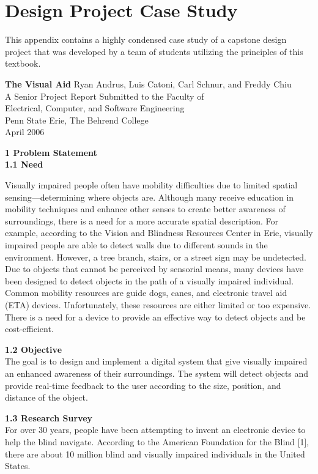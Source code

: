 \chapter{Design Project Case Study}
\label{chapter:appendixE}
\graphicspath{ {./appendixE/Fig} }

This appendix contains a highly condensed case study of a capstone
design project that was developed by a team of students utilizing the
principles of this textbook. 

\textbf{The Visual Aid}
Ryan Andrus, Luis Catoni, Carl Schnur, and Freddy Chiu \\
A Senior Project Report Submitted to the Faculty of \\
Electrical, Computer, and Software Engineering \\
Penn State Erie, The Behrend College \\
April 2006

\textbf{1 Problem Statement}\\
\textbf{1.1 Need}


Visually impaired people often have mobility difficulties due to limited
spatial sensing---determining where objects are. Although many receive
education in mobility techniques and enhance other senses to create
better awareness of surroundings, there is a need for a more accurate
spatial description. For example, according to the Vision and Blindness
Resources Center in Erie, visually impaired people are able to detect
walls due to different sounds in the environment. However, a tree
branch, stairs, or a street sign may be undetected. Due to objects that
cannot be perceived by sensorial means, many devices have been designed
to detect objects in the path of a visually impaired individual. Common
mobility resources are guide dogs, canes, and electronic travel aid
(ETA) devices. Unfortunately, these resources are either limited or too
expensive. There is a need for a device to provide an effective way to
detect objects and be cost-efficient.


\textbf{1.2 Objective}\\
The goal is to design and implement a digital system that give visually
impaired an enhanced awareness of their surroundings. The system will
detect objects and provide real-time feedback to the user according to
the size, position, and distance of the object.

\textbf{1.3 Research Survey} \\
For over 30 years, people have been attempting to invent an electronic
device to help the blind navigate. According to the American Foundation
for the Blind {[}1{]}, there are about 10 million blind and visually
impaired individuals in the United States.

